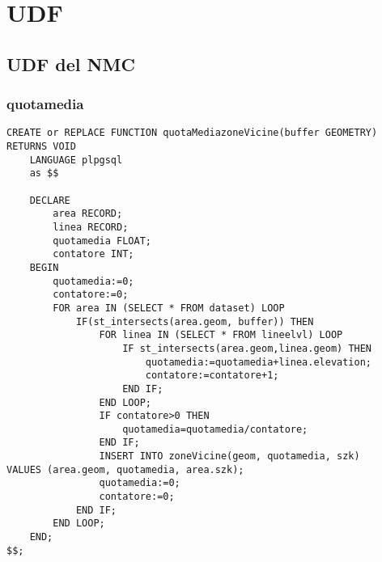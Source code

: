 \chapter{UDF}
\label{udf}
\section{UDF del NMC}
\label{udfnmc}
\subsection{quotamedia}


\begin{lstlisting}[style=mySQL]
CREATE or REPLACE FUNCTION quotaMediazoneVicine(buffer GEOMETRY) RETURNS VOID
	LANGUAGE plpgsql
	as $$

	DECLARE
		area RECORD;
		linea RECORD;
		quotamedia FLOAT;
		contatore INT;
	BEGIN
		quotamedia:=0;
		contatore:=0;
		FOR area IN (SELECT * FROM dataset) LOOP
			IF(st_intersects(area.geom, buffer)) THEN
				FOR linea IN (SELECT * FROM lineelvl) LOOP
					IF st_intersects(area.geom,linea.geom) THEN
						quotamedia:=quotamedia+linea.elevation;
						contatore:=contatore+1;
					END IF;
				END LOOP;
				IF contatore>0 THEN
					quotamedia=quotamedia/contatore;
				END IF;
				INSERT INTO zoneVicine(geom, quotamedia, szk)                                  VALUES (area.geom, quotamedia, area.szk);
				quotamedia:=0;
				contatore:=0;
			END IF;
		END LOOP;
	END;
$$;
\end{lstlisting}